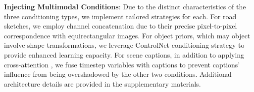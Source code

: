 \noindent \textbf{Injecting Multimodal Conditions}: 
Due to the distinct characteristics of the three conditioning types, we implement tailored strategies for each. For road sketches, we employ channel concatenation due to their precise pixel-to-pixel correspondence with equirectangular images. For object priors, which may object involve shape transformations, we leverage ControlNet \cite{zhang2023adding} conditioning strategy to provide enhanced learning capacity. For scene captions, in addition to applying cross-attention \cite{saharia2022photorealistic}, we fuse timestep variables with captions to prevent captions’ influence from being overshadowed by the other two conditions. Additional architecture details are provided in the supplementary materials.

